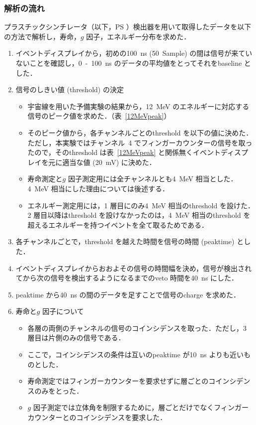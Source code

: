 \subsubsection{解析の流れ}
プラスチックシンチレータ（以下，PS ）検出器を用いて取得したデータを以下の方法で解析し，寿命，$g$ 因子，エネルギー分布を求めた．
\begin{enumerate}
\item イベントディスプレイから，初めの100~ns (50~Sample) の間は信号が来ていないことを確認し，0~-~100~ns のデータの平均値をとってそれをbaseline とした．
\item 信号のしきい値 (threshold) の決定
\begin{itemize}
\item 宇宙線を用いた予備実験の結果から，12~MeV のエネルギーに対応する信号のピーク値を求めた．（表~\ref{12MeVpeak}）%
\item そのピーク値から，各チャンネルごとのthreshold を以下の値に決めた．ただし，本実験ではチャンネル~4 でフィンガーカウンターの信号を取ったので，そのthreshold は表~\ref{12MeVpeak} と関係無くイベントディスプレイを元に適当な値 (20~mV) に決めた．
\item 寿命測定と$g$ 因子測定用には全チャンネルとも4~MeV 相当とした．4~MeV 相当にした理由については後述する．
\item エネルギー測定用には，1 層目にのみ4~MeV 相当のthreshold を設けた．2 層目以降はthreshold を設けなかったのは，4~MeV 相当のthreshold を超えるエネルギーを持つイベントを全て取るためである．
\end{itemize}
\item 各チャンネルごとで，threshold を越えた時間を信号の時間 (peaktime) とした．
\item イベントディスプレイからおおよその信号の時間幅を決め，信号が検出されてから次の信号を検出するようになるまでのveto 時間を40~ns にした．
\item peaktime から40~ns の間のデータを足すことで信号のcharge を求めた．
\item 寿命と$g$ 因子について
\begin{itemize}
\item 各層の両側のチャンネルの信号のコインシデンスを取った．ただし，3 層目は片側のみの信号である．
\item ここで，コインシデンスの条件は互いのpeaktime が10~ns よりも近いものとした．
\item 寿命測定ではフィンガーカウンターを要求せずに層ごとのコインシデンスのみをとった．
\item $g$ 因子測定では立体角を制限するために，層ごとだけでなくフィンガーカウンターとのコインシデンスを要求した．

\end{itemize}
\end{enumerate}
